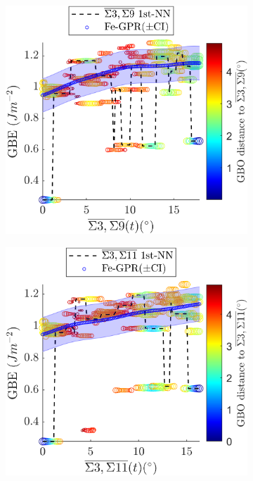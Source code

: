 \documentclass[final,twocolumn,12pt]{elsarticle}
\begin{document}
\begin{figure}[!htb]
		\begin{subfigure}[b]{0.48\textwidth}
			\includegraphics[width=\textwidth]{figures/tunnel-3-9-kim.png}
			\caption{}
			\label{fig:tunnel-3-9-kim}
		\end{subfigure}
		\hfill
		\begin{subfigure}[b]{0.48\textwidth}
			\includegraphics[width=\textwidth]{figures/tunnel-3-11-kim.png}

\end{subfigure}
\end{figure}
\end{document}
